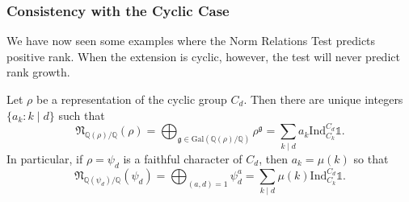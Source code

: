 \documentclass{beamer}
\newcommand{\Gal}{\mathrm{Gal}}
\newcommand{\Ind}{\mathrm{Ind}}
\newcommand{\QQ}{\mathbb{Q}}
\newcommand{\bQ}{\mathbb{Q}}
\newcommand{\fN}{\mathfrak{N}}
\newcommand{\repnorm}[1]{\fN_{\bQ(#1) / \bQ}(#1)}
\theoremstyle{plain}
\begin{document}
\begin{frame}
    \frametitle{Consistency with the Cyclic Case}
    We have now seen some examples where the Norm Relations Test predicts positive rank. When the extension is cyclic, however, the test will never predict rank growth.

    \begin{lemma}
        Let $\rho$ be a representation of the cyclic group $C_d$. Then there are unique integers $\{a_k:k\mid d\}$ such that 
        $$\repnorm{\rho}=\bigoplus_{\mathfrak{g}\in\Gal(\QQ(\rho)/\QQ)}\rho^{\mathfrak{g}}=\sum_{k\mid d}a_k\Ind_{C_k}^{C_d}\mathds{1}.$$
        In particular, if $\rho=\psi_d$ is a faithful character of $C_d$, then $a_k=\mu(k)$ so that
        $$\repnorm{\psi_d}=\bigoplus_{(a,d)=1}\psi_d^a=\sum_{k\mid d}\mu(k)\Ind_{C_k}^{C_d}\mathds{1}.$$
    \end{lemma}

\end{frame}
\end{document}
